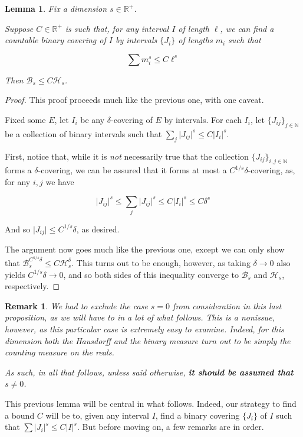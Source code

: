 \documentclass[11pt]{amsart}
\newcommand{\R}{\mathbb{R}}
\newcommand{\N}{\mathbb{N}}
\newcommand{\HH}{\mathcal{H}}
\newcommand{\BB}{\mathcal{B}}
\newtheorem{lemma}{Lemma}
\newtheorem{remark}{Remark}
\begin{document}
\begin{lemma}
Fix a dimension $s \in \R^+$.

Suppose $C \in \R^+$ is such that, for any interval $I$ of length $\ell$, we can find a countable binary covering of $I$ by intervals $\{J_i\}$ of lengths $m_i$ such that

\[\sum m_i^s \leq C \ell^s\]

Then $\BB_s \leq C \HH_s$.
\end{lemma}

\begin{proof}
This proof proceeds much like the previous one, with one caveat.

Fixed some $E$, let $I_i$ be any $\delta$-covering of $E$ by intervals. For each $I_i$, let $\{J_{ij}\}_{j \in \N}$ be a collection of binary intervals such that  $\sum_j \lvert J_{ij} \rvert^s \leq C \lvert I_i \rvert^s$.

First, notice that, while it is \emph{not} necessarily true that the collection $\{J_{ij}\}_{i,j \in \N}$ forms a $\delta$-covering, we can be assured that it forms at most a $C^{1/s}\delta$-covering, as, for any $i, j$ we have

\[ \lvert J_{ij} \rvert^s \leq \sum_j \lvert J_{ij} \rvert^s \leq C \lvert I_i \rvert^s \leq C \delta^s\]

And so $\lvert J_{ij} \rvert \leq C^{1/s} \delta$, as desired.

The argument now goes much like the previous one, except we can only show that $\BB_s^{C^{1/s} \delta} \leq C \HH_s^\delta$. This turns out to be enough, however, as taking $\delta \to 0$ also yields $C^{1/s} \delta \to 0$, and so both sides of this inequality converge to $\BB_s$ and $\HH_s$, respectively.
\end{proof}

\begin{remark} \label{dimnotzero}
We had to exclude the case $s = 0$ from consideration in this last proposition, as we will have to in a lot of what follows. This is a nonissue, however, as this particular case is extremely easy to examine. Indeed, for this dimension both the Hausdorff and the binary measure turn out to be simply the counting measure on the reals.

As such, in all that follows, unless said otherwise, \textbf{it should be assumed that $s \neq 0$}.
\end{remark}

This previous lemma will be central in what follows. Indeed, our strategy to find a bound $C$ will be to, given any interval $I$, find a binary covering $\{J_i\}$ of $I$ such that $\sum \lvert J_i \rvert^s \leq C \lvert I \rvert^s$. But before moving on, a few remarks are in order.
\end{document}
